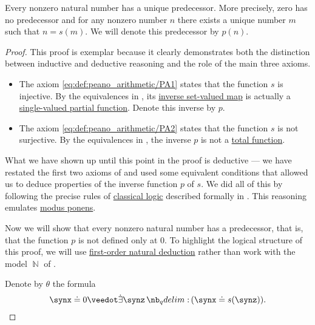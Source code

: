 \begin{proposition}\label{thm:nonzero_natural_numbers_have_predecessors}
  Every nonzero natural number has a unique predecessor. More precisely, zero has no predecessor and for any nonzero number \( n \) there exists a unique number \( m \) such that \( n = s(m) \). We will denote this predecessor by \( p(n) \).
\end{proposition}
\begin{proof}
  This proof is exemplar because it clearly demonstrates both the distinction between inductive and deductive reasoning and the role of the main three axioms.

  \begin{itemize}
    \item The axiom \eqref{eq:def:peano_arithmetic/PA1} states that the function \( s \) is injective. By the equivalences in , its \hyperref[def:set_valued_map/inverse]{inverse set-valued map} is actually a \hyperref[def:set_valued_map/partial]{single-valued partial function}. Denote this inverse by \( p \).

    \item The axiom \eqref{eq:def:peano_arithmetic/PA2} states that the function \( s \) is not surjective. By the equivalences in , the inverse \( p \) is not a \hyperref[def:set_valued_map/partial]{total function}.
  \end{itemize}

  What we have shown up until this point in the proof is deductive --- we have restated the first two axioms of  and used some equivalent conditions that allowed us to deduce properties of the inverse function \( p \) of \( s \). We did all of this by following the precise rules of \hyperref[con:classical_logic]{classical logic} described formally in . This reasoning emulates \hyperref[inf:thm:axiomatic_derivation_as_natural_deduction/mp]{modus ponens}.

  Now we will show that every nonzero natural number has a predecessor, that is, that the function \( p \) is not defined only at \( 0 \). To highlight the logical structure of this proof, we will use \hyperref[def:first_order_natural_deduction_system]{first-order natural deduction} rather than work with the model \( \BbbN \) of .

  Denote by \( \theta \) the formula
  \begin{equation*}
    \synx \syneq 0 \synvee \qexists \synz (\synx \syneq s(\synz)).
  \end{equation*}


\end{proof}
